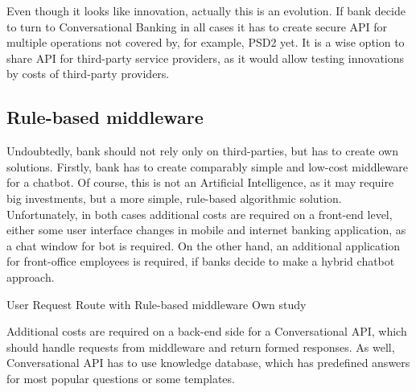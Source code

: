 Even though it looks like innovation, actually this is an evolution.
If bank decide to turn to Conversational Banking in all cases it has to create secure API for multiple operations not covered by, for example, PSD2 yet.
It is a wise option to share API for third-party service providers, as it would allow testing innovations by costs of third-party providers.


\subsection*{Rule-based middleware}

Undoubtedly, bank should not rely only on third-parties, but has to create own solutions.
Firstly, bank has to create comparably simple and low-cost middleware for a chatbot.
Of course, this is not an Artificial Intelligence, as it may require big investments, but a more simple, rule-based algorithmic solution.
Unfortunately, in both cases additional costs are required on a front-end level, either some user interface changes in mobile and internet banking application, as a chat window for bot is required.
On the other hand, an additional application for front-office employees is required, if banks decide to make a hybrid chatbot approach.

\mttable
{User Request Route with Rule-based middleware}
{Own study}
{
}

Additional costs are required on a back-end side for a Conversational API, which should handle requests from middleware and return formed responses.
As well, Conversational API has to use knowledge database, which has predefined answers for most popular questions or some templates.


